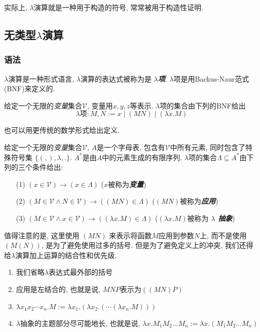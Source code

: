 实际上, $\lambda$演算就是一种用于构造的符号, 常常被用于构造性证明.

\subsection{无类型\texorpdfstring{$\lambda$}{lambda}演算}
\subsubsection{语法}
$\lambda$演算是一种形式语言, $\lambda$演算的表达式被称为是 \textit{\textbf{$\lambda$项}}. $\lambda$项是用Backus-Naur范式(BNF)来定义的. 
\begin{definition}
    给定一个无限的\textit{变量}集合$\mathcal{V}$, 变量用$x,y,z$等表示. $\lambda$项的集合由下列的BNF给出
    \[
        \lambda\text{项}: M, N:=x \mid (MN) \mid (\lambda x.M)
    \]
\end{definition}

也可以用更传统的数学形式给出定义. 
\begin{definition}
    给定一个无限的\textit{变量}集合$\mathcal{V}$, $A$是一个字母表, 包含有$\mathcal{V}$中所有元素, 同时包含了特殊符号集 $\{\left(\right., \left.\right), \lambda, . \}$. $A^*$是由$A$中的元素生成的有限序列. $\lambda$项的集合$\Lambda\subseteq A^*$由下列的三个条件给出:
    \begin{enumerate}
        \item[\normalfont(1)] $(x\in \mathcal V)\to (x\in \Lambda)$ \normalfont($x$被称为\textbf{\textit{变量}})
        \item[\normalfont(2)] $(M\in \mathcal V \land N \in \mathcal V)\to ((MN)\in \Lambda)$ ($(MN)$被称为\textbf{\textit{应用}})
        \item[\normalfont(3)] $(M\in \mathcal V \land x \in \mathcal V)\to ((\lambda x.M)\in \Lambda)$ ($(\lambda x.M)$被称为\textbf{\textit{ $\lambda$ 抽象}})
    \end{enumerate}
\end{definition}

值得注意的是, 这里使用 $(MN)$ 来表示将函数$M$应用到参数$N$上, 而不是使用 $(M(N))$, 是为了避免使用过多的括号. 但是为了避免定义上的冲突, 我们还得给$\lambda$演算加上运算的结合性和优先级.
\begin{enumerate}
    \item 我们省略$\lambda$表达式最外部的括号
    \item 应用是左结合的, 也就是说, $MNP$表示为$((MN)P)$
    \item $\lambda x_1x_2\cdots x_n.M := \lambda x_1.(\lambda x_2.(\cdots(\lambda x_n.M)))$
    \item $\lambda$抽象的主题部分尽可能地长, 也就是说, $\lambda x.M_1M_2\ldots M_n:=\lambda x.(M_1M_2\ldots M_n)$
\end{enumerate}

